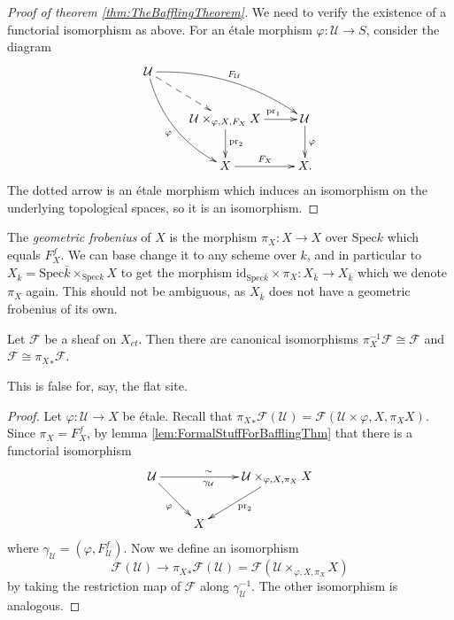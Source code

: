 \begin{proof}[Proof of theorem \ref{thm:TheBafflingTheorem}]
We need to verify the existence of a functorial isomorphism as above. For an 
\'etale morphism $\varphi: \mathcal{U} \to S$, consider the diagram
$$
\xymatrix{
\mathcal{U} \ar@{-->}[rd] \ar^{F_\mathcal{U}}@/^1pc/[rrd] 
\ar_{\varphi}@/_1pc/[rdd] \\
& {\mathcal{U} \times_{\varphi, X,F_X} X} \ar^{\qquad \text{pr}_1 \ \ }[r] 
\ar^{\text{pr}_2}[d] & \mathcal{U} \ar^{\varphi}[d] \\
& X \ar^{F_X}[r] & X.
}
$$
The dotted arrow is an \'etale morphism which induces an isomorphism on the 
underlying topological spaces, so it is an isomorphism.
\end{proof}


\begin{definition}
The \emph{geometric frobenius} of $X$ is the morphism $\pi_X : X \to X$ over 
$\text{Spec} k$ which equals $F_X^f$. We can base change it to any scheme over 
$k$, and in particular to $X_{\bar k} = \text{Spec}  \bar k \times_{\text{Spec} 
k} X$ to get the morphism $\text{id}_{\text{Spec} \bar k } \times \pi_X : 
X_{\bar k} \to X_{\bar k}$ which we denote $\pi_X$ again. This should not be 
ambiguous, as $X_{\bar k}$ does not have a geometric frobenius of its own.
\end{definition}

\begin{lemma}
Let $\mathcal{F}$ be a sheaf on $X_{et}$. Then there are canonical isomorphisms 
$\pi_X^{-1} \mathcal{F} \cong \mathcal{F}$ and $\mathcal{F} \cong {\pi_X}_* 
\mathcal{F}$.
\end{lemma}

This is false for, say, the flat site.

\begin{proof}
Let $\varphi: \mathcal{U} \to X$ be \'etale. Recall that ${\pi_X}_* \mathcal{F} 
(\mathcal{U}) = \mathcal{F} (\mathcal{U} \times{\varphi, X, \pi_X} X)$. Since 
$\pi_X = F_X^f$, by lemma \ref{lem:FormalStuffForBafflingThm} that there is a 
functorial isomorphism
$$
\xymatrix{
\mathcal{U} \ar_{\varphi}[rd] \ar^{\sim \quad}_{\gamma_\mathcal{U} \quad}[rr] 
&&  {\mathcal{U} \times_{\varphi, X, \pi_X} X} \ar^{\text{pr}_2}[ld]\\
& X
}
$$
where $\gamma_\mathcal{U} = (\varphi, F_\mathcal{U}^f)$. Now we define an 
isomorphism
$$
\mathcal{F} (\mathcal{U}) \longrightarrow {\pi_X}_* \mathcal{F} (\mathcal{U}) = 
\mathcal{F} (\mathcal{U} \times_{\varphi, X, \pi_X} X)
$$
by taking the restriction map of $\mathcal{F}$ along $\gamma_\mathcal{U}^{-1}$. 
The other isomorphism is analogous. 
\end{proof}

